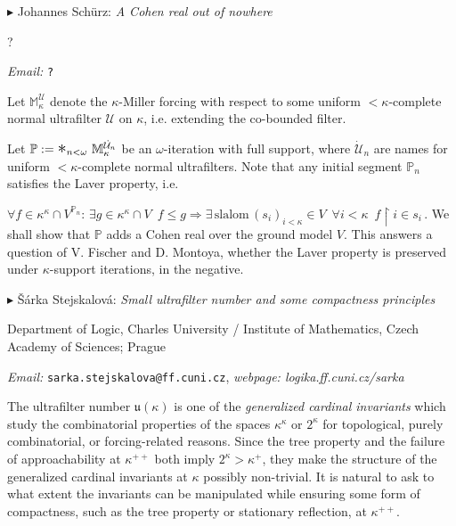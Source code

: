 \documentclass[a4paper]{amsart}
\theoremstyle{remark}
\renewcommand{\restriction}{\mathbin\upharpoonright}
\newcommand{\vsp}{\vspace{20pt}}
\begin{document}
\vsp 

\noindent 
$\blacktriangleright$ Johannes Sch\"urz: \emph{A Cohen real out of nowhere} 

\noindent 
?

\noindent 
\emph{Email:} \texttt{?}

Let $\mathbb{M}_\kappa ^{\mathcal{U}}$ denote the $\kappa$-Miller forcing with respect to some uniform ${<} \kappa$-complete normal ultrafilter $\mathcal{U}$ on $\kappa$, i.e. extending the co-bounded filter. 

Let $\mathbb{P}:= \mathlarger{\mathlarger{\mathlarger{*}}} _{n < \omega} \,\, \mathbb{M}_\kappa ^{\dot{\mathcal{U}}_n}$ be an $\omega$-iteration with full support, where $\dot{\mathcal{U}}_n$ are names for uniform ${<} \kappa$-complete normal ultrafilters. Note that any initial segment $\mathbb{P}_n$ satisfies the Laver property, i.e. 

$\forall f \in \kappa^{\kappa} \cap V^{\mathbb{P}_n}\colon \, \exists g \in \kappa^{\kappa} \cap V \,\,\,  f \leq g \Rightarrow \exists \, \text{slalom} \, (s_i)_{i < \kappa} \in V \,\,\, \forall i < \kappa \,\,\, f \restriction i \in s_i \, .$
 We shall show that $\mathbb{P}$ adds a Cohen real over the ground model $V$. This answers a question of V. Fischer and D. Montoya, whether the Laver property is preserved under $\kappa$-support iterations, in the negative.\\








\vsp 

\noindent 
$\blacktriangleright$ \v{S}\'{a}rka Stejskalov\'{a}: \emph{Small ultrafilter number and some compactness principles} 

\noindent 
Department of Logic, Charles University  / Institute of Mathematics, Czech Academy of Sciences; Prague

\noindent 
\emph{Email:} \texttt{sarka.stejskalova@ff.cuni.cz}, \emph{webpage: logika.ff.cuni.cz/sarka} 

The ultrafilter number $\mathfrak{u}(\kappa)$ is one of the \emph{generalized cardinal invariants} which study the combinatorial properties of the spaces $\kappa^\kappa$ or $2^\kappa$ for topological, purely combinatorial, or forcing-related reasons. Since the tree property and the failure of approachability at $\kappa^{++}$ both imply $2^\kappa>\kappa^+$, they make the structure of the generalized cardinal invariants at $\kappa$ possibly non-trivial. It is natural to ask to what extent the invariants can be manipulated while ensuring some form of compactness, such as the tree property or stationary reflection, at $\kappa^{++}$.
\end{document}
